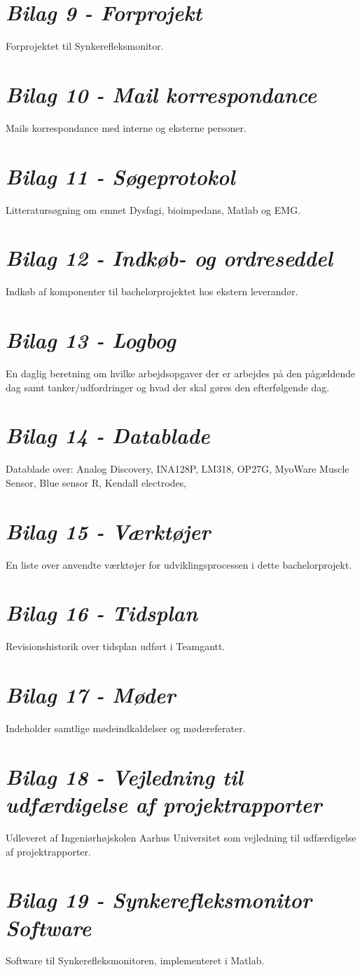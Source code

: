 \section*{\textit{Bilag 9 - Forprojekt}} \label{bilag10}
Forprojektet til Synkerefleksmonitor.
\section*{\textit{Bilag 10 - Mail korrespondance}} \label{bilag11}
Mails korrespondance med interne og eksterne personer.
\section*{\textit{Bilag 11 - Søgeprotokol}} \label{bilag12}
Litteratursøgning om emnet Dysfagi, bioimpedans, Matlab og EMG. 
\section*{\textit{Bilag 12 - Indkøb- og ordreseddel}} \label{bilag13}
Indkøb af komponenter til bachelorprojektet hos ekstern leverandør.
\section*{\textit{Bilag 13 - Logbog}} \label{bilag14}
En daglig beretning om hvilke arbejdsopgaver der er arbejdes på den pågældende dag samt tanker/udfordringer og hvad der skal gøres den efterfølgende dag.
\section*{\textit{Bilag 14 - Datablade}} \label{bilag15}
Datablade over: Analog Discovery, INA128P, LM318, OP27G, MyoWare Muscle Sensor, Blue sensor R, Kendall electrodes,
\section*{\textit{Bilag 15 - Værktøjer}} \label{bilag16}
En liste over anvendte værktøjer for udviklingsprocessen i dette bachelorprojekt.
\section*{\textit{Bilag 16 - Tidsplan}} \label{bilag17}
Revisionshistorik over tidsplan udført i Teamgantt.
\section*{\textit{Bilag 17 - Møder}} \label{bilag18}
Indeholder samtlige mødeindkaldelser og mødereferater.
\section*{\textit{Bilag 18 - Vejledning til udfærdigelse af projektrapporter}} \label{bilag19}
Udleveret af Ingeniørhøjskolen Aarhus Universitet som vejledning til udfærdigelse af projektrapporter.
\section*{\textit{Bilag 19 - Synkerefleksmonitor Software}} \label{bilag20}
Software til Synkerefleksmonitoren, implementeret i Matlab. 


